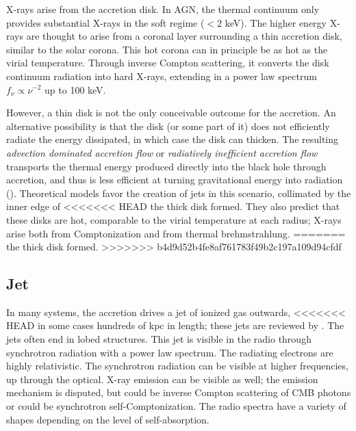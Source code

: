 X-rays arise from the accretion disk. In AGN, the thermal continuum
only provides substantial X-rays in the soft regime ($<2$ keV). The
higher energy X-rays are thought to arise from a coronal layer
surrounding a thin accretion disk, similar to the solar corona. This
hot corona can in principle be as hot as the virial
temperature. Through inverse Compton scattering, it converts the disk
continuum radiation into hard X-rays, extending in a power law
spectrum $f_\nu \propto \nu^{-2}$ up to 100 keV.

However, a thin disk is not the only conceivable outcome for the
accretion. An alternative possibility is that the disk (or some part
of it) does not efficiently radiate the energy dissipated, in which
case the disk can thicken. The resulting {\it advection dominated
accretion flow} or {\it radiatively inefficient accretion flow}
transports the thermal energy produced directly into the black hole
through accretion, and thus is less efficient at turning gravitational
energy into radiation (\citealt{narayan05a}). Theoretical models favor
the creation of jets in this scenario, collimated by the inner edge of
<<<<<<< HEAD
the thick disk formed. They also predict that these disks are hot,
comparable to the virial temperature at each radius; X-rays arise both
from Comptonization and from thermal brehmstrahlung.
=======
the thick disk formed.
>>>>>>> b4d9d52b4fe8af761783f49b2c197a109d94cfdf

\subsection{Jet}

In many systems, the accretion drives a jet of ionized gas outwards,
<<<<<<< HEAD
in some cases hundreds of kpc in length; these jets are reviewed
by \citet{blandford19a}.  The jets often end in lobed structures.
This jet is visible in the radio through synchrotron radiation with a
power law spectrum. The radiating electrons are highly
relativistic. The synchrotron radiation can be visible at higher
frequencies, up through the optical. X-ray emission can be visible as
well; the emission mechanism is disputed, but could be inverse Compton
scattering of CMB photons or could be synchrotron
self-Comptonization. The radio spectra have a variety of shapes
depending on the level of self-absorption.

